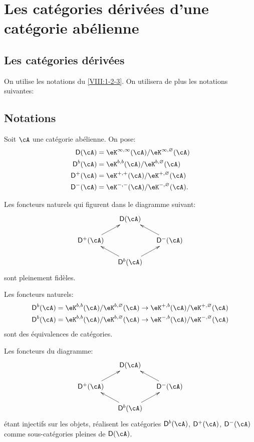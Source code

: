 \section{Les cat\'egories d\'eriv\'ees d'une cat\'egorie ab\'elienne}\label{VIII:3}





\subsection{Les cat\'egories d\'eriv\'ees}\label{VIII:3-1}

On utilise les notations du \ref{VIII:1-2-3}. On utilisera de plus les 
notations suivantes: 

\subsection{Notations}\label{VIII:3-1-1}

Soit $\cA$ une cat\'egorie ab\'elienne. On pose: 
\begin{align*}
  \D(\cA) &= \eK^{\infty,\infty}(\cA)/\eK^{\infty,\varnothing}(\cA) \\
  \D^b(\cA) &= \eK^{b,b}(\cA)/\eK^{b,\varnothing}(\cA) \\
  \D^+(\cA) &= \eK^{+,+}(\cA) / \eK^{+,\varnothing}(\cA) \\
  \D^-(\cA) &= \eK^{-,-}(\cA) / \eK^{-,\varnothing}(\cA) \text{.}
\end{align*}





\begin{proposition}\label{VIII:3-1-2}
Les foncteurs naturels qui figurent dans le diagramme suivant: 
\[\xymatrix@=0.5cm{
  & \D(\cA) \\
  \D^+(\cA) \ar[ur] 
    & & \D^-(\cA) \ar[ul] \\
  & \D^b(\cA) \ar[ul] \ar[ur] 
}\]
sont pleinement fid\`eles. 

Les foncteurs naturels: 
\begin{align*}
  \D^b(\cA) &= \eK^{b,b}(\cA)/\eK^{b,\varnothing}(\cA) \to \eK^{+,b}(\cA)/\eK^{+,\varnothing}(\cA) \\
  \D^b(\cA) &= \eK^{b,b}(\cA)/\eK^{b,\varnothing}(\cA) \to \eK^{-,b}(\cA) / \eK^{-,\varnothing}(\cA) 
\end{align*}
sont des \'equivalences de cat\'egories. 

Les foncteurs du diagramme: 
\[\xymatrix@=0.5cm{
  & \D(\cA) \\
  \D^+(\cA) \ar[ur] 
    & & \D^-(\cA) \ar[ul] \\
  & \D^b(\cA) \ar[ul] \ar[ur]
}\]
\'etant injectifs sur les objets, r\'ealisent les cat\'egories $\D^b(\cA)$, 
$\D^+(\cA)$, $\D^-(\cA)$ comme sous-cat\'egories pleines de $\D(\cA)$. 
\end{proposition}

